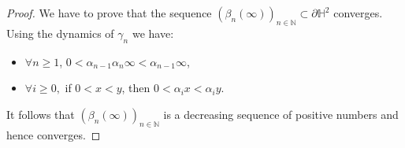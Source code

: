 \documentclass[a4paper,english,reqno]{amsart}
\renewcommand{\H}{\mathbb{H}}
\newcommand{\N}{\mathbb{N}} %
\theoremstyle{definition}
\numberwithin{equation}{section}
\begin{document}
\begin{proof}
	We have to prove that the sequence $(\beta_n(\infty))_{n\in\N}\subset \partial \H^2$ converges. 
	Using the dynamics of $\gamma_n$ we have:
	\begin{itemize}
		\item $\forall n\geq 1$, $0<\alpha_{n-1}\alpha_n\infty<\alpha_{n-1}\infty$,
		\item $\forall i\geq 0,$ if $0<x<y$, then $0<\alpha_i x<\alpha_iy.$
	\end{itemize}
	It follows that $(\beta_n(\infty))_{n\in\N}$ is a decreasing sequence of positive numbers and hence converges.
	
	
	
%	
	
	
%	

 \end{proof}
\end{document}
